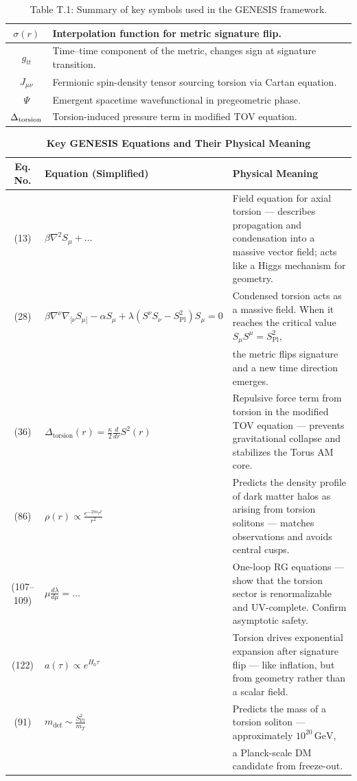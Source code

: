 \documentclass{article}
\begin{document}
\begin{table}[h!]
\begin{tabular}{|c|p{11cm}|}
\hline
$\sigma(r)$ & Interpolation function for metric signature flip. \\
\hline
$g_{tt}$ & Time–time component of the metric, changes sign at signature transition. \\
\hline
$J_{\mu\nu}$ & Fermionic spin-density tensor sourcing torsion via Cartan equation. \\
\hline
$\Psi$ & Emergent spacetime wavefunctional in pregeometric phase. \\
\hline
$\Delta_{\rm torsion}$ & Torsion-induced pressure term in modified TOV equation. \\
\hline
\end{tabular}
\caption*{Table T.1: Summary of key symbols used in the GENESIS framework.}
\end{table}

\begin{table}[h!]
\caption{\textbf{Key GENESIS Equations and Their Physical Meaning}}
\centering
\renewcommand{\arraystretch}{1.0}
\begin{tabular}{|c|l|p{9.0cm}|}
\hline
\textbf{Eq. No.} & \textbf{Equation (Simplified)} & \textbf{Physical Meaning} \\
\hline
(13) & \( \beta \nabla^2 S_\mu + \ldots \) & Field equation for axial torsion — describes propagation and condensation into a massive vector field; acts like a Higgs mechanism for geometry. \\
\hline
(28) & \( \beta \nabla^\nu \nabla_{[\nu} S_{\mu]} - \alpha S_\mu + \lambda (S^\nu S_\nu - S_{\mathrm{Pl}}^2) S_\mu = 0 \) & 
Condensed torsion acts as a massive field. When it reaches the critical value \(S_\mu S^\mu = S^2_{\mathrm{Pl}}\), \\ 
\cline{3-3}
 & & the metric flips signature and a new time direction emerges. \\
\hline

(36) & \( \Delta_{\text{torsion}}(r) = \frac{\kappa}{2} \frac{d}{dr} S^2(r) \) & Repulsive force term from torsion in the modified TOV equation — prevents gravitational collapse and stabilizes the Torus AM core. \\
\hline
(86) & \( \rho(r) \propto \frac{e^{-2 m_T r}}{r^2} \) & Predicts the density profile of dark matter halos as arising from torsion solitons — matches observations and avoids central cusps. \\
\hline
(107–109) & \( \mu \frac{d\lambda}{d\mu} = \ldots \) & One-loop RG equations — show that the torsion sector is renormalizable and UV-complete. Confirm asymptotic safety. \\
\hline
(122) & \( a(\tau) \propto e^{H_0 \tau} \) & Torsion drives exponential expansion after signature flip — like inflation, but from geometry rather than a scalar field. \\
\hline
(91) & \( m_{\mathrm{def}} \sim \frac{S^2_{\mathrm{Pl}}}{m_T} \) & 
Predicts the mass of a torsion soliton — approximately \(10^{20}\,\mathrm{GeV}\), \\ 
\cline{3-3}
 & & a Planck-scale DM candidate from freeze-out. \\
\hline


\end{tabular}
\end{table}
\end{document}
